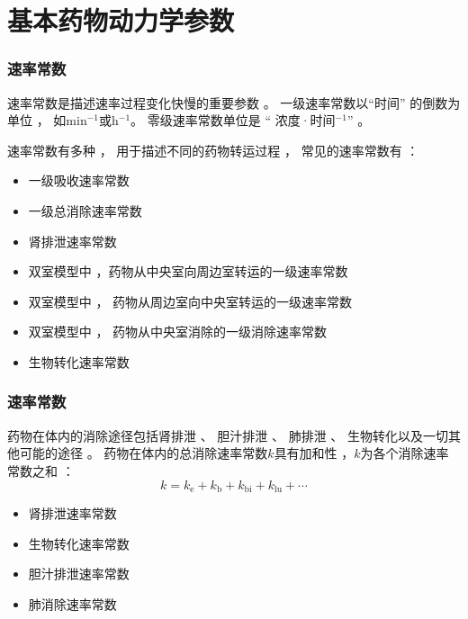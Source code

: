 \documentclass[dvipsnames, svgnames, x11names]{beamer}
\begin{document}
\section{基本药物动力学参数}


\begin{frame}
	\frametitle{速率常数}
	速率常数是描述速率过程变化快慢的重要参数 。 一级速率常数以“时间” 的倒数为单位 ， 如min$^{-1}$或h$^{-1}$。 零级速率常数单位是 “ 浓度·时间$^{-1}$” 。
	
	速率常数有多种 ， 用于描述不同的药物转运过程 ， 常见的速率常数有 ：
	\begin{itemize}
	  \item[$k_\mathrm{a}$] 一级吸收速率常数
	  \item[$k$\ ] 一级总消除速率常数
	  \item[$k_\mathrm{e}$] 肾排泄速率常数
	  \item[$k_{12}$] 双室模型中 ，药物从中央室向周边室转运的一级速率常数
	  \item[$k_{21}$] 双室模型中 ， 药物从周边室向中央室转运的一级速率常数
	  \item[$k_{10}$] 双室模型中 ， 药物从中央室消除的一级消除速率常数
	  \item[$k_\mathrm{b}$] 生物转化速率常数
	\end{itemize}
\end{frame}


\begin{frame}
	\frametitle{速率常数}
	药物在体内的消除途径包括肾排泄 、 胆汁排泄 、 肺排泄 、 生物转化以及一切其他可能的途径 。 药物在体内的总消除速率常数$k$具有加和性 ，$k$为各个消除速率常数之和 ：
	\[
		k=k_{\mathrm{e}}+k_{\mathrm{b}}+k_{\mathrm{bi}}+k_{\mathrm{lu}}+\cdots 
	\]
	\vspace{-1em}
	\begin{itemize}
		\item[$k_\mathrm{e}$] 肾排泄速率常数
		\item[$k_\mathrm{b}$] 生物转化速率常数
		\item[$k_\mathrm{bi}$] 胆汁排泄速率常数
		\item[$k_\mathrm{lu}$] 肺消除速率常数
	  \end{itemize}
\end{frame}
\end{document}
